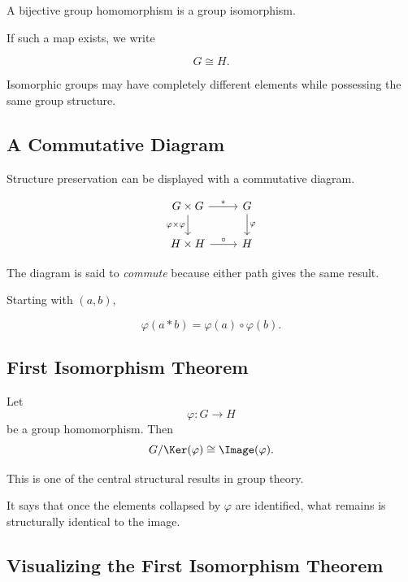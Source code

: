 A bijective group homomorphism is a group isomorphism.

If such a map exists, we write

\[ G\cong H. \]

Isomorphic groups may have completely different elements while possessing the
same group structure.

\subsection{A Commutative Diagram}
\label{subsec:group-commutative-diagram}

Structure preservation can be displayed with a commutative diagram.

\[
\begin{tikzcd}
G\times G \arrow[r,"*"] \arrow[d,"\varphi\times\varphi"'] &
G \arrow[d,"\varphi"]\\
H\times H \arrow[r,"\circ"] &
H
\end{tikzcd}
\]

The diagram is said to \emph{commute} because either path gives the same
result.

Starting with \((a,b)\),

\[ \varphi(a*b)=\varphi(a)\circ\varphi(b). \]

\subsection{First Isomorphism Theorem}
\label{subsec:first-isomorphism-theorem-groups}

\begin{theorem}
Let
\[ \varphi:G\to H \]
be a group homomorphism. Then
\[ G/\Ker(\varphi)\cong\Image(\varphi). \]
\end{theorem}

This is one of the central structural results in group theory.

It says that once the elements collapsed by \(\varphi\) are identified, what
remains is structurally identical to the image.

\subsection{Visualizing the First Isomorphism Theorem}
\label{subsec:visual-first-isomorphism}


